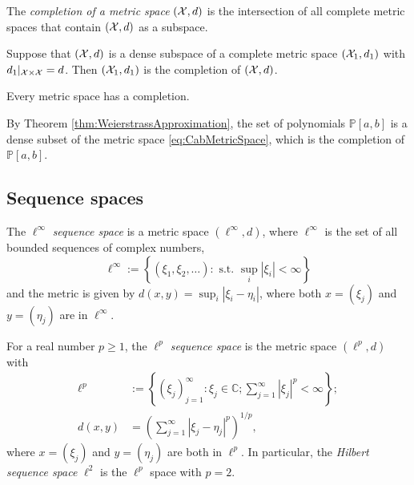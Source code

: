 \begin{defn}
  \label{def:completionMetricSpace}
  The \emph{completion of a metric space} $({\cal X}, d)$ 
  is the intersection of all complete metric spaces
  that contain $({\cal X}, d)$ as a subspace.
\end{defn}


\begin{lem}
  \label{lem:denseCompletion}
  Suppose that $({\cal X}, d)$ is a dense subspace
  of a complete metric space $({\cal X}_1, d_1)$
  with $d_1|_{{\cal X}\times{\cal X}} = d$.
  Then $({\cal X}_1, d_1)$ is the completion of $({\cal X}, d)$.
\end{lem}


\begin{thm}
  \label{thm:existenceOfMetricCompletion}
  Every metric space has a completion.
\end{thm}

\begin{exm}
  \label{exm:polynomialDenseInCab}
  By Theorem \ref{thm:WeierstrassApproximation}, 
  the set of polynomials $\mathbb{P}[a,b]$
  is a dense subset of the metric space \eqref{eq:CabMetricSpace}, 
  which is the completion of $\mathbb{P}[a,b]$.
\end{exm}


\subsection{Sequence spaces}
\label{sec:metric-spaces-basicAnal}


\begin{defn}
  \label{def:lInftySeqSpace}
  The $\ell^{\infty}$ \emph{sequence space} 
  is a metric space $(\ell^{\infty},d)$,
  where $\ell^{\infty}$ is the set of all bounded sequences
  of complex numbers,
  \begin{equation}
    \label{eq:ellInftySpace}
    \ell^{\infty} := \left\{
      (\xi_1, \xi_2, \ldots):
      \text{ s.t. } \sup_{i}|\xi_i| < \infty
      \right\}
  \end{equation}
  and the metric is given by
  $d(x,y) = \sup_{i}|\xi_i- \eta_i|$, 
  where both $x=(\xi_j)$ and $y=(\eta_j)$ are in $\ell^{\infty}$. 
\end{defn}

\begin{defn}
  \label{def:lpSpace}
  For a real number $p\ge 1$,
   the \emph{$\ell^p$ sequence space} is the metric space $(\ell^p, d)$
   with
  \begin{align}
    \label{eq:lpSpace}
    \ell^p &:= \left\{
               (\xi_j)_{j=1}^{\infty}: \xi_j\in \mathbb{C};
               \sum_{j=1}^{\infty} |\xi_j|^p < \infty
    \right\};
    \\
    \label{eq:lpMetric}
    d(x,y) &= \left(\sum_{j=1}^{\infty} |\xi_j -\eta_j|^p\right)^{1/p},
  \end{align}             
  where $x=(\xi_j)$ and $y=(\eta_j)$ are both in $\ell^p$.
  In particular, the \emph{Hilbert sequence space} $\ell^2$
   is the $\ell^p$ space with $p=2$.
\end{defn}



